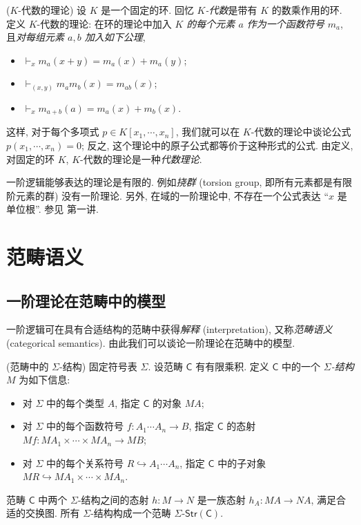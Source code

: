 \begin{example}
	{($K$-代数的理论)}
	设 $K$ 是一个固定的环. 回忆 \emph{$K$-代数}是带有 $K$ 的数乘作用的环. 定义 $K$-代数的理论: 在环的理论中加入 \emph{$K$ 的每个元素 $a$ 作为一个函数符号 $m_a$}, 且\emph{对每组元素 $a,b$ 加入如下公理},
	\begin{itemize}
		\item $\vdash_x m_a(x+y) = m_a(x) + m_a(y)$;
		\item $\vdash_{(x,y)} m_am_b (x) = m_{ab}(x)$;
		\item $\vdash_x m_{a+b}(a) = m_a(x) + m_b(x)$.
	\end{itemize}
	这样, 对于每个多项式 $p\in K[x_1,\cdots,x_n]$, 我们就可以在 $K$-代数的理论中谈论公式 $p(x_1,\cdots,x_n) = 0$; 反之, 这个理论中的原子公式都等价于这种形式的公式.
	由定义, 对固定的环 $K$, $K$-代数的理论是一种\emph{代数理论}.
\end{example}

\begin{remark}
	{}
	一阶逻辑能够表达的理论是有限的. 例如\emph{挠群} (torsion group, 即所有元素都是有限阶元素的群) 没有一阶理论.
	另外, 在域的一阶理论中, 不存在一个公式表达 ``$x$ 是单位根''. 参见 \cite{Lurie-Categorical-Logic} 第一讲.
\end{remark}

\section{范畴语义}

\subsection{一阶理论在范畴中的模型}

一阶逻辑可在具有合适结构的范畴中获得\emph{解释} (interpretation), 又称\emph{范畴语义} (categorical semantics).
由此我们可以谈论一阶理论在范畴中的模型.

\begin{definition}
	{(范畴中的 $\Sigma$-结构)}
	固定符号表 $\Sigma$. 设范畴 $\mathsf C$ 有有限乘积.
	定义 $\mathsf C$ 中的一个 \emph{$\Sigma$-结构} $M$ 为如下信息:
	\begin{itemize}
		\item 对 $\Sigma$ 中的每个类型 $A$, 指定 $\mathsf C$ 的对象 $MA$;
		\item 对 $\Sigma$ 中的每个函数符号 $f\colon A_1\cdots A_n \to B$, 指定 $\mathsf C$ 的态射
		$Mf \colon MA_1\times\cdots\times MA_n \to MB$;
		\item 对 $\Sigma$ 中的每个关系符号 $R \hookrightarrow A_1\cdots A_n$, 指定 $\mathsf C$ 中的子对象
		$MR \hookrightarrow MA_1\times\cdots\times MA_n$.
	\end{itemize}
	
	范畴 $\mathsf C$ 中两个 $\Sigma$-结构之间的态射 $h\colon M\to N$ 是一族态射 $h_A \colon MA \to NA$, 满足合适的交换图. 所有 $\Sigma$-结构构成一个范畴 $\Sigma\text{-}\mathsf{Str}(\mathsf C)$.
\end{definition}

